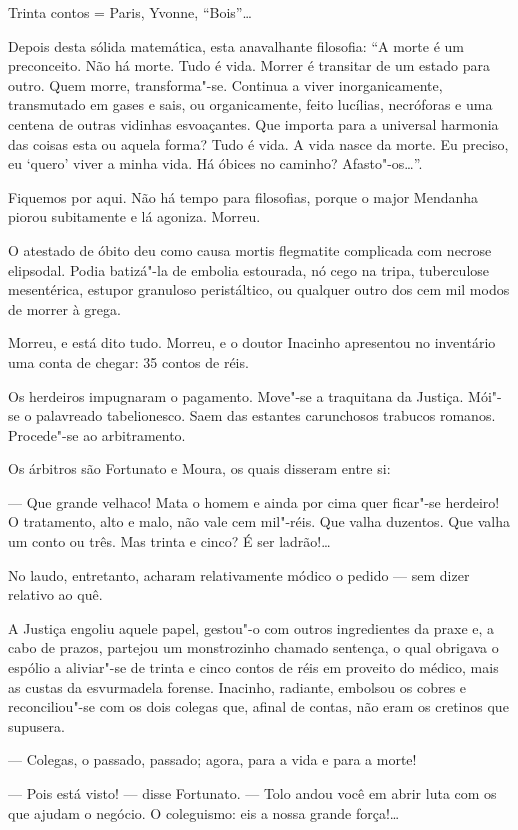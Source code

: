 Trinta contos = Paris, Yvonne, ``Bois''\ldots{}

Depois desta sólida matemática, esta anavalhante filosofia: ``A morte é
um preconceito. Não há morte. Tudo é vida. Morrer é transitar de um
estado para outro. Quem morre, transforma"-se. Continua a viver
inorganicamente, transmutado em gases e sais, ou organicamente, feito
lucílias, necróforas e uma centena de outras vidinhas esvoaçantes. Que
importa para a universal harmonia das coisas esta ou aquela forma? Tudo
é vida. A vida nasce da morte. Eu preciso, eu `quero' viver a minha
vida. Há óbices no caminho? Afasto"-os\ldots{}''.

Fiquemos por aqui. Não há tempo para filosofias, porque o major Mendanha
piorou subitamente e lá agoniza. Morreu.

O atestado de óbito deu como causa mortis flegmatite complicada com
necrose elipsodal. Podia batizá"-la de embolia estourada, nó cego na
tripa, tuberculose mesentérica, estupor granuloso peristáltico, ou
qualquer outro dos cem mil modos de morrer à grega.

Morreu, e está dito tudo. Morreu, e o doutor Inacinho apresentou no
inventário uma conta de chegar: 35 contos de réis.

Os herdeiros impugnaram o pagamento. Move"-se a traquitana da Justiça.
Mói"-se o palavreado tabelionesco. Saem das estantes carunchosos trabucos
romanos. Procede"-se ao arbitramento.

Os árbitros são Fortunato e Moura, os quais disseram entre si:

--- Que grande velhaco! Mata o homem e ainda por cima quer ficar"-se
herdeiro! O tratamento, alto e malo, não vale cem mil"-réis. Que valha
duzentos. Que valha um conto ou três. Mas trinta e cinco? É ser
ladrão!\ldots{}

No laudo, entretanto, acharam relativamente módico o pedido --- sem
dizer relativo ao quê.

A Justiça engoliu aquele papel, gestou"-o com outros ingredientes da
praxe e, a cabo de prazos, partejou um monstrozinho chamado sentença, o
qual obrigava o espólio a aliviar"-se de trinta e cinco contos de réis em
proveito do médico, mais as custas da esvurmadela forense. Inacinho,
radiante, embolsou os cobres e reconciliou"-se com os dois colegas que,
afinal de contas, não eram os cretinos que supusera.

--- Colegas, o passado, passado; agora, para a vida e para a morte!

--- Pois está visto! --- disse Fortunato. --- Tolo andou você em abrir
luta com os que ajudam o negócio. O coleguismo: eis a nossa grande
força!\ldots{}

